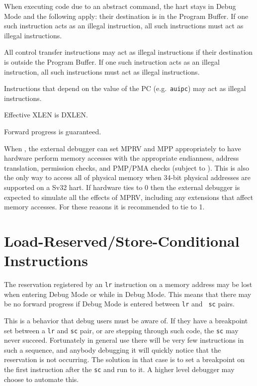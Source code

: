 \begin{steps}{When executing code due to an abstract command, the hart stays in
    Debug Mode and the following apply:}
    their destination is in the Program Buffer. If one such instruction acts as
    an illegal instruction, all such instructions must act as illegal
    instructions.
\item All control transfer instructions may act as illegal instructions if
    their destination is outside the Program Buffer. If one such instruction
    acts as an illegal instruction, all such instructions must act as
    illegal instructions.
\item Instructions that depend on the value of the PC (e.g.\ {\tt auipc}) may act
    as illegal instructions.
\item Effective XLEN is DXLEN.
\item Forward progress is guaranteed.
\end{steps}

\begin{commentary}
    When , the external debugger can set MPRV and MPP appropriately to
    have hardware perform memory accesses with the appropriate endianness, address
    translation, permission checks, and PMP/PMA checks (subject to \FdmAbstractcsRelaxedpriv).
    This is also the only way to access all of physical memory when 34-bit physical
    addresses are supported on a Sv32 hart. If hardware ties \FcsrDcsrMprven to 0 then the
    external debugger is expected to simulate all the effects of MPRV, including
    any extensions that affect memory accesses.
    For these reasons it is recommended to tie \FcsrDcsrMprven to 1.
\end{commentary}

\section{Load-Reserved/Store-Conditional Instructions}

The reservation registered by an {\tt lr} instruction on a memory address may
be lost when entering Debug Mode or while in Debug Mode.  This means that there
may be no forward progress if Debug Mode is entered between {\tt lr} and {\tt
sc} pairs.

\begin{commentary}
    This is a behavior that debug users must be aware of. If they have a
    breakpoint set between a {\tt lr} and {\tt sc} pair, or are stepping
    through such code, the {\tt sc} may never succeed.  Fortunately in general use
    there will be very few instructions in such a sequence, and anybody
    debugging it will quickly notice that the reservation is not occurring.
    The solution in that case is to set a breakpoint on the first instruction
    after the {\tt sc} and run to it. A higher level debugger may choose to
    automate this.
\end{commentary}


